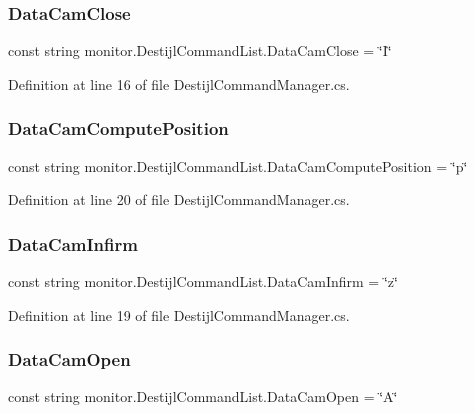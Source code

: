 \subsubsection{Data\+Cam\+Close}
{\footnotesize\ttfamily const string monitor.\+Destijl\+Command\+List.\+Data\+Cam\+Close = \char`\"{}I\char`\"{}}



Definition at line 16 of file Destijl\+Command\+Manager.\+cs.

\mbox{\label{classmonitor_1_1_destijl_command_list_ab114adce60b63976d8304f2ad11b317a}} 
\subsubsection{Data\+Cam\+Compute\+Position}
{\footnotesize\ttfamily const string monitor.\+Destijl\+Command\+List.\+Data\+Cam\+Compute\+Position = \char`\"{}p\char`\"{}}



Definition at line 20 of file Destijl\+Command\+Manager.\+cs.

\mbox{\label{classmonitor_1_1_destijl_command_list_ad3985694a06148f2014cb346e8891cba}} 
\subsubsection{Data\+Cam\+Infirm}
{\footnotesize\ttfamily const string monitor.\+Destijl\+Command\+List.\+Data\+Cam\+Infirm = \char`\"{}z\char`\"{}}



Definition at line 19 of file Destijl\+Command\+Manager.\+cs.

\mbox{\label{classmonitor_1_1_destijl_command_list_a6380d1518931373bd0dfb84f888942e0}} 
\subsubsection{Data\+Cam\+Open}
{\footnotesize\ttfamily const string monitor.\+Destijl\+Command\+List.\+Data\+Cam\+Open = \char`\"{}A\char`\"{}}



